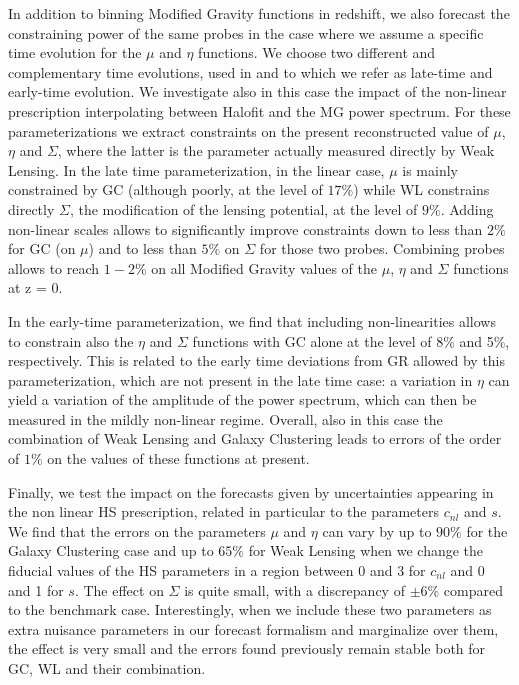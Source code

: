In addition to binning Modified Gravity functions in redshift, we also forecast the constraining power of the same probes in the case where we assume a specific time evolution for the $\mu$ and $\eta$ functions. We choose two different and complementary time evolutions, used in \cite{planck_collaboration_planck_2016} and to which we refer as late-time and early-time evolution. We investigate also in this case the impact of the non-linear prescription interpolating between Halofit and the MG power spectrum. For these parameterizations we 
extract constraints on the present reconstructed value of $\mu$,  $\eta$ and $\Sigma$, where the latter is the parameter actually measured directly by Weak Lensing.  
In the late time parameterization, in the linear case, $\mu$ is mainly constrained by GC (although poorly, at the level of $17\%$) while WL constrains directly $\Sigma$, the modification of the lensing potential, at the level of $9\%$. Adding non-linear scales allows to significantly improve constraints down to less than $2\%$ for GC (on $\mu$) and to less than $5\%$ on $\Sigma$ for those two probes. Combining probes allows to reach $1-2\%$ on all Modified Gravity values of the $\mu$,  $\eta$ and $\Sigma$ functions at z = 0.

In the early-time parameterization, we find that including non-linearities allows to constrain also the $\eta$ and $\Sigma$ functions with GC alone at the level of 8\% and 5\%, respectively. This is related to the early time 
deviations from GR allowed by this parameterization, which are not present in the late time case: a variation in $\eta$ can
yield a variation of the amplitude of the power spectrum, which can then be measured in the mildly non-linear regime.
Overall, also in this case the combination of Weak Lensing and Galaxy Clustering leads to errors of the order of $1\%$ on the
values of these functions at present. 


Finally, we test the impact on the forecasts given by uncertainties appearing in the non linear HS prescription, related in particular to the parameters $c_{nl}$ and $s$. We find that
the errors on the parameters $\mu$ and $\eta$ can vary by up to 
$90\%$ for the Galaxy Clustering case and up to $65\%$ for Weak Lensing when we change the fiducial values of the HS parameters in a region between 0 and 3 for $c_{nl}$
and 0 and 1 for $s$. The effect on $\Sigma$ is quite small, with a discrepancy of $\pm 6 \%$ compared to the benchmark case.
Interestingly, when we include these two parameters as extra nuisance parameters in our forecast formalism and marginalize over them, 
the effect is very small and the errors found previously remain stable both for GC, WL and their combination.


